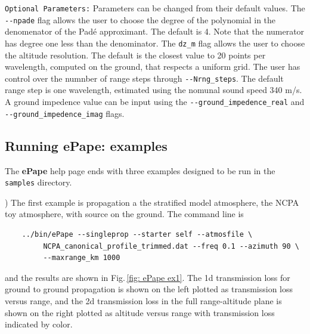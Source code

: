 \verb+Optional Parameters:+ Parameters can be changed from their default values. The \verb+--npade+ flag allows the user to choose the degree of the polynomial in the denomenator of the Pad\'e approximant. The default is 4. Note that the numerator has degree one less than the denominator. The \verb+dz_m+ flag allows the user to choose the altitude resolution. The default is the closest value to 20 points per wavelength, computed on the ground, that respects a uniform grid. The user has control over the numnber of range steps through \verb+--Nrng_steps+. The default range step is one wavelength, estimated using the nomunal sound speed 340 m/s. A ground impedence value can be input using the \verb+--ground_impedence_real+ and \verb+--ground_impedence_imag+ flags. 


\subsection{Running ePape: examples}
\label{sec: pade examples}

The {\bf ePape} help page ends with three examples designed to be run in the \verb+samples+ directory. 

) The first example is propagation a the stratified model atmosphere, the NCPA toy atmosphere, with source on the ground. The command line is 
\begin{verbatim}
    ../bin/ePape --singleprop --starter self --atmosfile \
         NCPA_canonical_profile_trimmed.dat --freq 0.1 --azimuth 90 \
         --maxrange_km 1000
\end{verbatim}
and the results are shown in Fig.\,\ref{fig: ePape ex1}. The 1d transmission loss for ground to ground propagation is shown on the left plotted as transmission loss versus range, and the 2d transmission loss in the full range-altitude plane is shown on the right plotted as altitude versus range with transmission loss indicated by color. 

